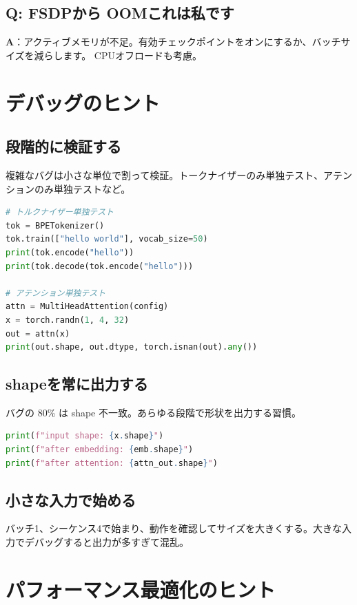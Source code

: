 \subsection{Q: FSDPから OOMこれは私です}

\textbf{A}：アクティブメモリが不足。有効チェックポイントをオンにするか、バッチサイズを減らします。 CPUオフロードも考慮。

\section{デバッグのヒント}

\subsection{段階的に検証する}

複雑なバグは小さな単位で割って検証。トークナイザーのみ単独テスト、アテンションのみ単独テストなど。

\begin{lstlisting}[language=Python]
# トルクナイザー単独テスト
tok = BPETokenizer()
tok.train(["hello world"], vocab_size=50)
print(tok.encode("hello"))
print(tok.decode(tok.encode("hello")))

# アテンション単独テスト
attn = MultiHeadAttention(config)
x = torch.randn(1, 4, 32)
out = attn(x)
print(out.shape, out.dtype, torch.isnan(out).any())
\end{lstlisting}

\subsection{shapeを常に出力する}

バグの 80\% は shape 不一致。あらゆる段階で形状を出力する習慣。

\begin{lstlisting}[language=Python]
print(f"input shape: {x.shape}")
print(f"after embedding: {emb.shape}")
print(f"after attention: {attn_out.shape}")
\end{lstlisting}

\subsection{小さな入力で始める}

バッチ1、シーケンス4で始まり、動作を確認してサイズを大きくする。大きな入力でデバッグすると出力が多すぎて混乱。

\section{パフォーマンス最適化のヒント}

